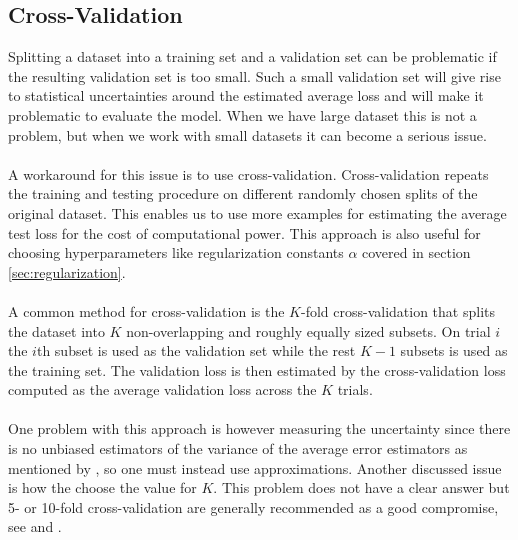 \subsection{Cross-Validation} \label{sec:cv}
Splitting a dataset into a training set and a validation set can be problematic if the resulting validation set is too small. Such a small validation set will give rise to statistical uncertainties around the estimated average loss and will make it problematic to evaluate the model. When we have large dataset this is not a problem, but when we work with small datasets it can become a serious issue. \\
\\
A workaround for this issue is to use cross-validation. Cross-validation repeats the training and testing procedure on different randomly chosen splits of the original dataset. This enables us to use more examples for estimating the average test loss for the cost of computational power. This approach is also useful for choosing hyperparameters like regularization constants $\alpha$ covered in section \ref{sec:regularization}.\\
\\
A common method for cross-validation is the $K$-fold cross-validation that splits the dataset into $K$ non-overlapping and roughly equally sized subsets. On trial $i$ the $i$th subset is used as the validation set while the rest $K - 1$ subsets is used as the training set. The validation loss is then estimated by the cross-validation loss computed as the average validation loss across the $K$ trials.\\
\\
One problem with this approach is however measuring the uncertainty since there is no unbiased estimators of the variance of the average error estimators as mentioned by \cite{Bengio04}, so one must instead use approximations. Another discussed issue is how the choose the value for $K$. This problem does not have a clear answer but 5- or 10-fold cross-validation are generally recommended as a good compromise, see \cite{brieman_spector_1992} and \cite{kohavi_1992}.

